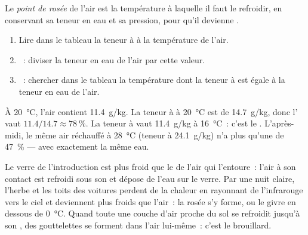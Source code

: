\begin{definition}\label{def:g10:why-clouds-form:dew-point}
Le \emph{point de rosée} de l'air est
la température à laquelle il faut le refroidir, en conservant sa teneur en
eau et sa pression, pour qu'il devienne .
\end{definition}

\begin{method}\label{met:g10:why-clouds-form:table}
\begin{enumerate}
  \item Lire dans le tableau la teneur à  à la température de
        l'air.
  \item {}~: diviser la teneur en eau de l'air par cette
        valeur.
  \item {}~: chercher dans le tableau la température dont la
        teneur à  est égale à la teneur en eau de l'air.
\end{enumerate}
\end{method}

\begin{example}\label{ex:g10:why-clouds-form:morning}
À \qty{20}{\degreeCelsius}, l'air contient \qty{11.4}{g/kg}. La teneur à
 à \qty{20}{\degreeCelsius} est de \qty{14.7}{g/kg}, donc
l' vaut $11.4/14.7 \approx \qty{78}{\percent}$. La teneur à
 vaut \qty{11.4}{g/kg} à \qty{16}{\degreeCelsius}~: c'est le
. L'après-midi, le même air réchauffé à
\qty{28}{\degreeCelsius} (teneur à  \qty{24.1}{g/kg}) n'a plus
qu'une  de \qty{47}{\percent} --- avec exactement la même
eau.
\end{example}

Le verre de l'introduction est plus froid que le  de l'air
qui l'entoure~: l'air à son contact est refroidi sous son  et
dépose de l'eau sur le verre. Par une nuit claire, l'herbe et les toits des
voitures perdent de la chaleur en rayonnant de l'infrarouge vers le ciel et
deviennent plus froids que l'air~: la rosée s'y forme, ou le givre en
dessous de \qty{0}{\degreeCelsius}. Quand toute une couche d'air proche du
sol se refroidit jusqu'à son , des gouttelettes se forment
dans l'air lui-même~: c'est le brouillard.


